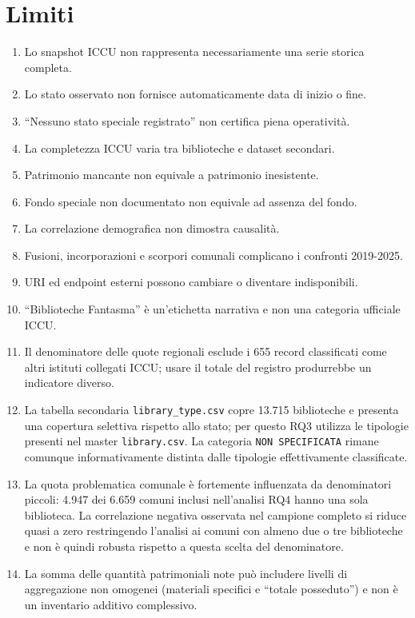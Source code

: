 \documentclass[11pt,a4paper]{article}
\begin{document}
\section{Limiti}
\begin{enumerate}
\item Lo snapshot ICCU non rappresenta necessariamente una serie storica completa.
\item Lo stato osservato non fornisce automaticamente data di inizio o fine.
\item ``Nessuno stato speciale registrato'' non certifica piena operatività.
\item La completezza ICCU varia tra biblioteche e dataset secondari.
\item Patrimonio mancante non equivale a patrimonio inesistente.
\item Fondo speciale non documentato non equivale ad assenza del fondo.
\item La correlazione demografica non dimostra causalità.
\item Fusioni, incorporazioni e scorpori comunali complicano i confronti 2019-2025.
\item URI ed endpoint esterni possono cambiare o diventare indisponibili.
\item ``Biblioteche Fantasma'' è un'etichetta narrativa e non una categoria ufficiale ICCU.
\item Il denominatore delle quote regionali esclude i 655 record classificati come altri istituti collegati ICCU; usare il totale del registro produrrebbe un indicatore diverso.
\item La tabella secondaria \texttt{library\_type.csv} copre 13.715 biblioteche e presenta una copertura selettiva rispetto allo stato; per questo RQ3 utilizza le tipologie presenti nel master \texttt{library.csv}. La categoria \texttt{NON SPECIFICATA} rimane comunque informativamente distinta dalle tipologie effettivamente classificate.
\item La quota problematica comunale è fortemente influenzata da denominatori piccoli: 4.947 dei 6.659 comuni inclusi nell'analisi RQ4 hanno una sola biblioteca. La correlazione negativa osservata nel campione completo si riduce quasi a zero restringendo l'analisi ai comuni con almeno due o tre biblioteche e non è quindi robusta rispetto a questa scelta del denominatore.
\item La somma delle quantità patrimoniali note può includere livelli di aggregazione non omogenei (materiali specifici e ``totale posseduto'') e non è un inventario additivo complessivo.

\end{enumerate}
\end{document}
